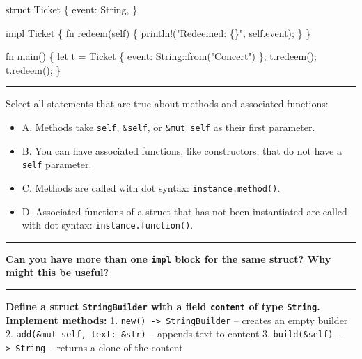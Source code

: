 \documentclass[
  11pt,
]{article}
\newenvironment{Shaded}{}{}
\newcommand{\NormalTok}[1]{#1}
\providecommand{\tightlist}{%
  \setlength{\itemsep}{0pt}\setlength{\parskip}{0pt}}
\begin{document}
\begin{Shaded}
\begin{Highlighting}[]
\NormalTok{struct Ticket \{}
\NormalTok{    event: String,}
\NormalTok{\}}

\NormalTok{impl Ticket \{}
\NormalTok{    fn redeem(self) \{}
\NormalTok{        println!("Redeemed: \{\}", self.event);}
\NormalTok{    \}}
\NormalTok{\}}

\NormalTok{fn main() \{}
\NormalTok{    let t = Ticket \{ event: String::from("Concert") \};}
\NormalTok{    t.redeem();}
\NormalTok{    t.redeem();}
\NormalTok{\}}
\end{Highlighting}
\end{Shaded}

\begin{center}\rule{0.5\linewidth}{0.5pt}\end{center}

Select all statements that are true about methods and associated
functions:

\begin{itemize}
\tightlist
\item[$\square$]
  A. Methods take \texttt{self}, \texttt{\&self}, or
  \texttt{\&mut\ self} as their first parameter.
\item[$\square$]
  B. You can have associated functions, like constructors, that do not
  have a \texttt{self} parameter.
\item[$\square$]
  C. Methods are called with dot syntax: \texttt{instance.method()}.
\item[$\square$]
  D. Associated functions of a struct that has not been instantiated are
  called with dot syntax: \texttt{instance.function()}.
\end{itemize}

\begin{center}\rule{0.5\linewidth}{0.5pt}\end{center}

\textbf{Can you have more than one \texttt{impl} block for the same
struct? Why might this be useful?}

\begin{center}\rule{0.5\linewidth}{0.5pt}\end{center}

\textbf{Define a struct \texttt{StringBuilder} with a field
\texttt{content} of type \texttt{String}. Implement methods:} 1.
\texttt{new()\ -\textgreater{}\ StringBuilder} -- creates an empty
builder 2. \texttt{add(\&mut\ self,\ text:\ \&str)} -- appends text to
content 3. \texttt{build(\&self)\ -\textgreater{}\ String} -- returns a
clone of the content
\end{document}
